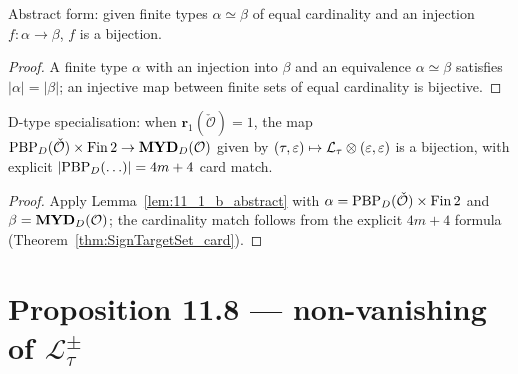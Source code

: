 \begin{lemma}
  \label{lem:11_1_b_abstract}
  \leanok
  Abstract form: given finite types $\alpha \simeq \beta$ of equal cardinality and an injection $f : \alpha \to \beta$, $f$ is a bijection.
\end{lemma}
\begin{proof}
  \leanok
  A finite type $\alpha$ with an injection into $\beta$ and an equivalence $\alpha \simeq \beta$ satisfies $|\alpha| = |\beta|$; an injective map between finite sets of equal cardinality is bijective.
\end{proof}


\begin{lemma}
  \label{lem:11_1_b_D}
  \leanok
  D-type specialisation: when $\mathbf{r}_1(\check{\mathcal{O}}) = 1$, the map
  $\mathrm{PBP}_D(\check{\mathcal{O}}) \times \mathrm{Fin}\,2 \to \mathbf{MYD}_D(\mathcal{O})$ given by $(\tau, \varepsilon) \mapsto \mathcal{L}_\tau \otimes (\varepsilon, \varepsilon)$
  is a bijection, with explicit $|\mathrm{PBP}_D(\ldots)| = 4m + 4$ card match.
\end{lemma}
\begin{proof}
  \leanok
  Apply Lemma~\ref{lem:11_1_b_abstract} with $\alpha = \mathrm{PBP}_D(\check{\mathcal{O}}) \times \mathrm{Fin}\,2$ and $\beta = \mathbf{MYD}_D(\mathcal{O})$; the cardinality match follows from the explicit $4m + 4$ formula (Theorem~\ref{thm:SignTargetSet_card}).
\end{proof}


\section{Proposition 11.8 — non-vanishing of $\mathcal{L}_\tau^\pm$}

